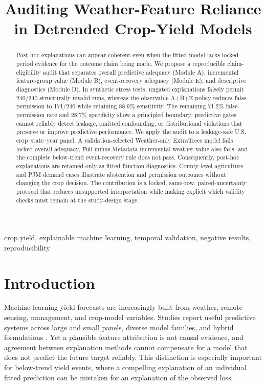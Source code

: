 \documentclass[conference]{IEEEtran}
\title{Auditing Weather-Feature Reliance in Detrended Crop-Yield Models}
\author{\IEEEauthorblockN{Anonymous Submission}}
\begin{document}
\maketitle

\begin{abstract}
Post-hoc explanations can appear coherent even when the fitted model lacks
locked-period evidence for the outcome claim being made. We propose a
reproducible claim-eligibility audit that separates overall predictive adequacy
(Module A), incremental feature-group value (Module B), event-recovery adequacy
(Module E), and descriptive diagnostics (Module D). In synthetic stress tests, ungated
explanations falsely permit 240/240 structurally invalid runs, whereas the
observable A+B+E policy reduces false permission to 171/240 while retaining
88.9\% sensitivity. The remaining 71.2\% false-permission rate and 28.7\%
specificity show a principled boundary: predictive gates cannot reliably detect
leakage, omitted confounding, or distributional violations that preserve or
improve predictive performance. We apply the audit to a leakage-safe U.S.
crop--state--year panel. A validation-selected Weather-only ExtraTrees model
fails locked overall adequacy, Full-minus-Metadata incremental weather value
also fails, and the complete below-trend event-recovery rule does not pass.
Consequently, post-hoc explanations are retained only as fitted-function
diagnostics. County-level agriculture and PJM demand cases illustrate abstention
and permission outcomes without changing the crop decision. The contribution is a locked, same-row, paired-uncertainty protocol
that reduces unsupported interpretation while making explicit which validity
checks must remain at the study-design stage.
\end{abstract}

\begin{IEEEkeywords}
crop yield, explainable machine learning, temporal validation, negative results,
reproducibility
\end{IEEEkeywords}

\section{Introduction}
Machine-learning yield forecasts are increasingly built from weather, remote
sensing, management, and crop-model variables. Studies report useful predictive
systems across large and small panels, diverse model families, and hybrid
formulations \cite{Paudel2021,Meroni2021,LengHall2020,Klompenburg2020}.
Yet a plausible feature attribution is not causal evidence, and agreement between
explanation methods cannot compensate for a model that does not predict the future
target reliably. This distinction is especially important for below-trend yield
events, where a compelling explanation of an individual fitted prediction can be
mistaken for an explanation of the observed loss.
\end{document}
